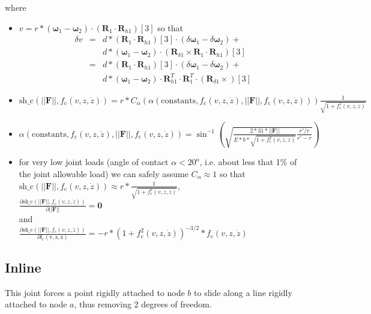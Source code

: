 \documentclass[10pt,fleqn,subeqn]{report}
\newcommand{\T}[1]{\bm{#1}}
\begin{document}
where
\begin{itemize}
\item
$v=r * (\T \omega_{1}-\T \omega_{2})\cdot(\T R_1\cdot \T R_{h1})[3]$
so that
\begin{eqnarray*}
\delta v &=& d * (\T R_1\cdot \T R_{h1})[3] \cdot (\delta \T \omega_{1}- \delta \T \omega_{2}) +\\
	&& d * (\T \omega_{1}-\T \omega_{2})\cdot (\T R_{\delta 1} \times \T R_1 \cdot \T R_{h1})[3]\\
	&=& d * (\T R_1\cdot \T R_{h1})[3] \cdot (\delta \T \omega_{1}- \delta \T \omega_{2}) +\\
	&& d * (\T \omega_{1}-\T \omega_{2})\cdot \T R_{h1}^T \cdot \T R_1^T \cdot (\T R_{\delta 1} \times )[3]
\end{eqnarray*}
\item
$
\mathrm{sh\_c}(||\T F||, f_{\mathrm{c}}(v,z,\dot{z}))=
r * 
C_\alpha(
	\alpha(\mathrm{constants},
		f_{\mathrm{c}}(v,z,\dot{z}),
		||\T F||,
		f_{\mathrm{c}}(v,z,\dot{z})
	)
) 
\frac{\displaystyle 1}{\displaystyle \sqrt{1+f_{\mathrm{c}}^2(v,z,\dot{z})}}
$
\item
$
\alpha(\mathrm{constants},
	f_{\mathrm{c}}(v,z,\dot{z}),
	||\T F||,
	f_{\mathrm{c}}(v,z,\dot{z})
) =
\sin^{-1}\left(
	\sqrt{
		\frac{\displaystyle 2*31*||\T F||}
			{\displaystyle E*b*\sqrt{1+f_{\mathrm{c}}^2(v,z,\dot{z})}}
		\frac{\displaystyle r'/r}
			{\displaystyle r'-r}
	}
\right)
$
\item for very low joint loads (angle of contact $\alpha< 20^{\mathrm{o}}$,
i.e. about less that 1\% of the joint allowable load)
we can safely assume $C_\alpha\approx 1$
so that\\ 
$
\mathrm{sh\_c}(||\T F||, f_{\mathrm{c}}(v,z,\dot{z}))\approx
r * 
\frac{\displaystyle 1}{\displaystyle \sqrt{1+f_{\mathrm{c}}^2(v,z,\dot{z})}}
$,\\

$
\frac{\displaystyle\partial \mathrm{sh\_c}(||\T F||, f_{\mathrm{c}}(v,z,\dot{z}))}
	{\displaystyle \partial ||\T F||} = \T 0
$\\
and\\
$
\frac{\displaystyle\partial \mathrm{sh\_c}(||\T F||, f_{\mathrm{c}}(v,z,\dot{z}))}
	{\displaystyle\partial \mathrm{f_{\mathrm{c}}(v,z,\dot{z})}} =
	-r * (1+f_{\mathrm{c}}^2(v,z,\dot{z}))^{-3/2}*f_{\mathrm{c}}(v,z,\dot{z})
$
\end{itemize}



\subsection{Inline}
This joint forces a point rigidly attached to node $b$ to slide
along a line rigidly attached to node $a$, thus removing 2 degrees of freedom.
\end{document}
